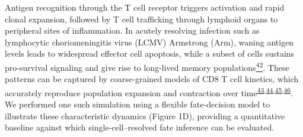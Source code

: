 Antigen recognition through the T cell receptor triggers activation and
rapid clonal expansion, followed by T cell trafficking through lymphoid
organs to peripheral sites of inflammation. In acutely resolving
infection such as lymphocytic choriomeningitis virus (LCMV) Armstrong
(Arm), waning antigen levels leads to widespread effector cell
apoptosis, while a subset of cells sustains pro-survival signaling and
give rise to long-lived memory
populations\href{https://sciwheel.com/work/citation?ids=770431\&pre=\&suf=\&sa=0\&dbf=0}{\textsuperscript{42}}.
These patterns can be captured by coarse-grained models of CD8 T cell
kinetics, which accurately reproduce population expansion and
contraction over
time\textsuperscript{\href{https://sciwheel.com/work/citation?ids=15970531\&pre=\&suf=\&sa=0\&dbf=0}{43,}\href{https://sciwheel.com/work/citation?ids=314516\&pre=\&suf=\&sa=0\&dbf=0}{44,}\href{https://sciwheel.com/work/citation?ids=424634\&pre=\&suf=\&sa=0\&dbf=0}{45,}\href{https://sciwheel.com/work/citation?ids=8454326\&pre=\&suf=\&sa=0\&dbf=0}{46}}.
We performed one such simulation using a flexible fate-decision model to
illustrate these characteristic dynamics (Figure 1D), providing a
quantitative baseline against which single-cell--resolved fate inference
can be evaluated.

